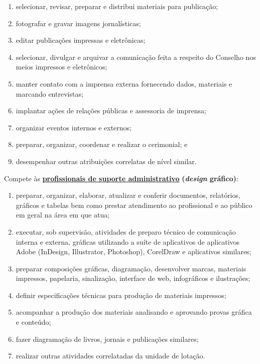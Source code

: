 \begin{enumerate}

  \item
        selecionar, revisar, preparar e distribui materiais para publicação;
  \item
        fotografar e gravar imagens jornalísticas;
  \item
        editar publicações impressas e eletrônicas;
  \item
        selecionar, divulgar e arquivar a comunicação feita a respeito do
        Conselho nos meios impressos e eletrônicos;
  \item
        manter contato com a imprensa externa fornecendo dados, materiais e
        marcando entrevistas;
  \item
        implantar ações de relações públicas e assessoria de imprensa;
  \item
        organizar eventos internos e externos;
  \item
        preparar, organizar, coordenar e realizar o cerimonial; e
  \item
        desempenhar outras atribuições correlatas de nível similar.
\end{enumerate}

Compete às
\href{https://transparencia.cfp.org.br/crp06/wp-content/uploads/sites/29/2023/03/Resolucao-CRP-002-2023.pdf}{\textbf{profissionais
    de suporte administrativo}} \textbf{(\emph{design} gráfico)}:

\begin{enumerate}

  \item
        preparar, organizar, elaborar, atualizar e conferir documentos,
        relatórios, gráficos e tabelas bem como prestar atendimento ao
        profissional e ao público em geral na área em que atua;
  \item
        executar, sob supervisão, atividades de preparo técnico de comunicação
        interna e externa, gráficas utilizando a suíte de aplicativos de
        aplicativos Adobe (InDesign, Illustrator, Photoshop), CorelDraw e
        aplicativos similares;
  \item
        preparar composições gráficas, diagramação, desenvolver marcas,
        materiais impressos, papelaria, sinalização, interface de web,
        infográficos e ilustrações;
  \item
        definir especificações técnicas para produção de materiais impressos;
  \item
        acompanhar a produção dos materiais analisando e aprovando provas
        gráfica e conteúdo;
  \item
        fazer diagramação de livros, jornais e publicações similares;
  \item
        realizar outras atividades correlatadas da unidade de lotação.
\end{enumerate}

